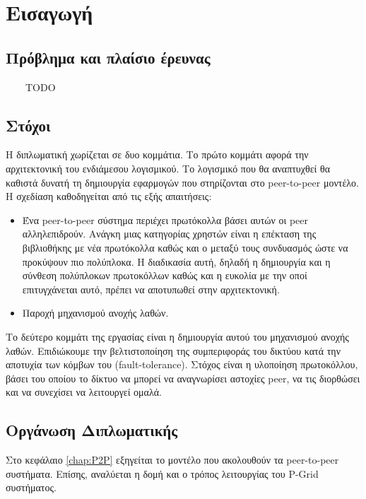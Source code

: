 \chapter{Εισαγωγή}
\label{chap:Intro}

\section{Πρόβλημα και πλαίσιο έρευνας}

\ \ \ \ TODO

\section{Στόχοι}

Η διπλωματική χωρίζεται σε δυο κομμάτια. Το πρώτο κομμάτι αφορά την 
αρχιτεκτονική του ενδιάμεσου λογισμικού. Το λογισμικό που θα αναπτυχθεί 
θα καθιστά δυνατή τη δημιουργία εφαρμογών που στηρίζονται στο peer-to-peer 
μοντέλο. Η σχεδίαση καθοδηγείται από τις εξής απαιτήσεις:

\begin{itemize}
\item Ένα peer-to-peer σύστημα περιέχει πρωτόκολλα βάσει αυτών οι peer 
αλληλεπιδρούν. Ανάγκη μιας κατηγορίας χρηστών είναι η επέκταση της 
βιβλιοθήκης με νέα πρωτόκολλα καθώς και ο μεταξύ τους συνδυασμός ώστε να 
προκύψουν πιο πολύπλοκα. Η διαδικασία αυτή, δηλαδή η δημιουργία και η 
σύνθεση πολύπλοκων πρωτοκόλλων καθώς και η ευκολία με την οποί 
επιτυγχάνεται αυτό, πρέπει να αποτυπωθεί στην αρχιτεκτονική.
\item Παροχή μηχανισμού ανοχής λαθών.
\end{itemize}

Το δεύτερο κομμάτι της εργασίας είναι η δημιουργία αυτού του μηχανισμού 
ανοχής λαθών. Επιδιώκουμε την βελτιστοποίηση της συμπεριφοράς του 
δικτύου κατά την αποτυχία των κόμβων του (fault-tolerance). Στόχος είναι 
η υλοποίηση πρωτοκόλλου, βάσει του οποίου το δίκτυο να μπορεί να αναγνωρίσει 
αστοχίες peer, να τις διορθώσει και να συνεχίσει να λειτουργεί ομαλά.

\section{Οργάνωση Διπλωματικής}

Στο κεφάλαιο \ref{chap:P2P} εξηγείται το μοντέλο που ακολουθούν τα 
peer-to-peer συστήματα. Επίσης, αναλύεται η δομή και ο τρόπος λειτουργίας 
του P-Grid 
\citep{Abererb, Aberer, Abererc, Abererd, Aberer2004, Aberer2003, Aberere, Aberer2002} 
συστήματος.

